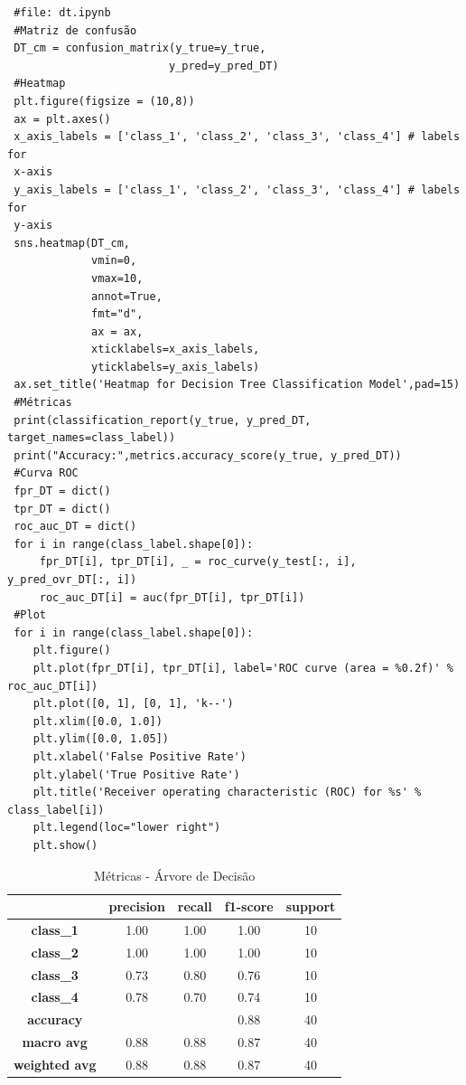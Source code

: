\documentclass[
	article,			%
	11pt,				%
	oneside,			%
	a4paper,			%
	english,			%
	brazil,				%
	sumario=tradicional
	]{abntex2}
\begin{document}
\begin{verbatim}
 #file: dt.ipynb
 #Matriz de confusão
 DT_cm = confusion_matrix(y_true=y_true, 
                         y_pred=y_pred_DT)
 #Heatmap
 plt.figure(figsize = (10,8))
 ax = plt.axes()
 x_axis_labels = ['class_1', 'class_2', 'class_3', 'class_4'] # labels for
 x-axis
 y_axis_labels = ['class_1', 'class_2', 'class_3', 'class_4'] # labels for
 y-axis
 sns.heatmap(DT_cm,
             vmin=0,
             vmax=10,
             annot=True,
             fmt="d",
             ax = ax,
             xticklabels=x_axis_labels, 
             yticklabels=y_axis_labels)
 ax.set_title('Heatmap for Decision Tree Classification Model',pad=15)
 #Métricas
 print(classification_report(y_true, y_pred_DT, target_names=class_label))
 print("Accuracy:",metrics.accuracy_score(y_true, y_pred_DT))
 #Curva ROC
 fpr_DT = dict()
 tpr_DT = dict()
 roc_auc_DT = dict()
 for i in range(class_label.shape[0]):
     fpr_DT[i], tpr_DT[i], _ = roc_curve(y_test[:, i], y_pred_ovr_DT[:, i])
     roc_auc_DT[i] = auc(fpr_DT[i], tpr_DT[i])
 #Plot
 for i in range(class_label.shape[0]):
    plt.figure()
    plt.plot(fpr_DT[i], tpr_DT[i], label='ROC curve (area = %0.2f)' % roc_auc_DT[i])
    plt.plot([0, 1], [0, 1], 'k--')
    plt.xlim([0.0, 1.0])
    plt.ylim([0.0, 1.05])
    plt.xlabel('False Positive Rate')
    plt.ylabel('True Positive Rate')
    plt.title('Receiver operating characteristic (ROC) for %s' % class_label[i])
    plt.legend(loc="lower right")
    plt.show()
\end{verbatim}


\begin{table}[h!]
\centering
\begin{tabular}{c|c|c|c|c|}
\cline{2-5}
                                            & \textbf{precision} & \textbf{recall} & \textbf{f1-score} & \textbf{support} \\ \hline
\multicolumn{1}{|c|}{\textbf{class\_1}}     & 1.00               & 1.00            & 1.00              & 10               \\ \hline
\multicolumn{1}{|c|}{\textbf{class\_2}}     & 1.00               & 1.00            & 1.00              & 10               \\ \hline
\multicolumn{1}{|c|}{\textbf{class\_3}}     & 0.73               & 0.80            & 0.76              & 10               \\ \hline
\multicolumn{1}{|c|}{\textbf{class\_4}}     & 0.78               & 0.70            & 0.74              & 10               \\ \hline
\multicolumn{1}{|c|}{\textbf{accuracy}}     &                    &                 & 0.88              & 40               \\ \hline
\multicolumn{1}{|c|}{\textbf{macro avg}}    & 0.88               & 0.88            & 0.87              & 40               \\ \hline
\multicolumn{1}{|c|}{\textbf{weighted avg}} & 0.88               & 0.88            & 0.87              & 40               \\ \hline
\end{tabular}
\caption{Métricas - Árvore de Decisão}
\label{tab:dt_01}
\end{table}
\end{document}
